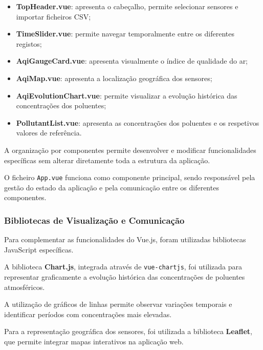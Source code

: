 \begin{itemize}

    \item \textbf{TopHeader.vue}:
    apresenta o cabeçalho, permite selecionar
    sensores e importar ficheiros CSV;

    \item \textbf{TimeSlider.vue}:
    permite navegar temporalmente entre os
    diferentes registos;

    \item \textbf{AqiGaugeCard.vue}:
    apresenta visualmente o índice de qualidade
    do ar;

    \item \textbf{AqiMap.vue}:
    apresenta a localização geográfica dos
    sensores;

    \item \textbf{AqiEvolutionChart.vue}:
    permite visualizar a evolução histórica
    das concentrações dos poluentes;

    \item \textbf{PollutantList.vue}:
    apresenta as concentrações dos poluentes
    e os respetivos valores de referência.

\end{itemize}

A organização por componentes permite
desenvolver e modificar funcionalidades
específicas sem alterar diretamente
toda a estrutura da aplicação.

O ficheiro \texttt{App.vue} funciona como
componente principal, sendo responsável pela
gestão do estado da aplicação e pela
comunicação entre os diferentes componentes.


\subsubsection{Bibliotecas de Visualização e Comunicação}

Para complementar as funcionalidades do Vue.js,
foram utilizadas bibliotecas JavaScript específicas.

A biblioteca \textbf{Chart.js}, integrada através
de \texttt{vue-chartjs}, foi utilizada para
representar graficamente a evolução histórica
das concentrações de poluentes atmosféricos.

A utilização de gráficos de linhas permite
observar variações temporais e identificar
períodos com concentrações mais elevadas.

Para a representação geográfica dos sensores,
foi utilizada a biblioteca \textbf{Leaflet},
que permite integrar mapas interativos
na aplicação web.

